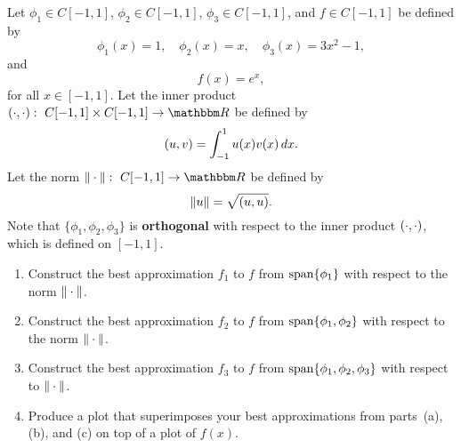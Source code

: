 
Let $\phi_1\in C[-1,1]$, $\phi_2\in C[-1,1]$, $\phi_3\in C[-1,1]$, and $f\in C[-1,1]$ be defined by
\[
\phi_1(x) = 1, \quad \phi_2(x) = x, \quad \phi_3(x) = 3x^2-1,
\]
and
\[
f(x) = e^x,
\]
for all $x\in[-1,1]$. Let the inner product $\ip{\cdot,\cdot}:\mbox{ }C[-1,1]\times C[-1,1]\rightarrow\R$ be defined by
\[
(u,v) = \int_{-1}^1 u(x)v(x)\, dx.
\]
Let the norm $\norm{\cdot}:\mbox{ }C[-1,1]\rightarrow\R$ be defined by
\[
\|u\| = \sqrt{(u,u)}.
\]
Note that $\{\phi_1,\phi_2,\phi_3\}$ is \textbf{orthogonal} with respect to the inner product $(\cdot,\cdot)$, which is defined on $[-1,1]$.
\\
\begin{enumerate}
\item Construct the best approximation $f_1$ to $f$ from ${\rm span}\{\phi_1\}$ with respect to the norm $\|\cdot\|$.
\\
\item Construct the best approximation $f_2$ to $f$ from ${\rm span}\{\phi_1,\phi_2\}$ with respect to the norm $\|\cdot\|$.
\\
\item Construct the best approximation $f_3$ to $f$ from ${\rm span}\{\phi_1,\phi_2,\phi_3\}$ with respect to $\|\cdot\|$.
\\
\item  Produce a plot that superimposes your best approximations from parts~(a), (b), and (c) on top of a plot of $f(x)$.
\end{enumerate}




